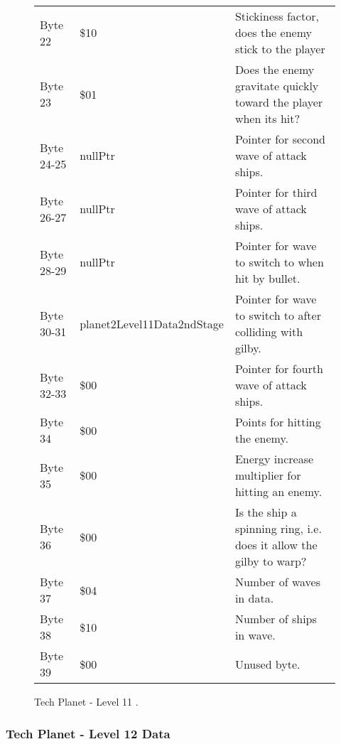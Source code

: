\begin{figure}[H]
{\begin{adjustbox}{width=12cm}
\begin{tabular}{lll}
 Byte 22    & \$10                        & Stickiness factor, does the enemy stick to the player               \\
 Byte 23    & \$01                        & Does the enemy gravitate quickly toward the player when its hit?    \\
 Byte 24-25 & nullPtr                    & Pointer for second wave of attack ships.                            \\
 Byte 26-27 & nullPtr                    & Pointer for third wave of attack ships.                             \\
 Byte 28-29 & nullPtr                    & Pointer for wave to switch to when hit by bullet.                   \\
 Byte 30-31 & planet2Level11Data2ndStage & Pointer for  wave to switch to after colliding with gilby.          \\
 Byte 32-33 & \$00                        & Pointer for fourth wave of attack ships.                            \\
 Byte 34    & \$00                        & Points for hitting the enemy.                                       \\
 Byte 35    & \$00                        & Energy increase multiplier for hitting an enemy.                    \\
 Byte 36    & \$00                        & Is the ship a spinning ring, i.e. does it allow the gilby to warp?  \\
 Byte 37    & \$04                        & Number of waves in data.                                            \\
 Byte 38    & \$10                        & Number of ships in wave.                                            \\
 Byte 39    & \$00                        & Unused byte.                                                        \\
\bottomrule
\end{tabular}

  \end{adjustbox}

  }\caption*{Tech Planet - Level 11
.}
\end{figure}

\clearpage
\subsubsection{Tech Planet - Level 12 Data}

